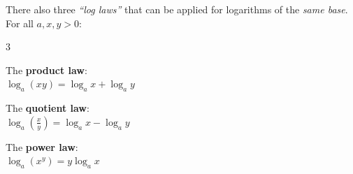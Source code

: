 \documentclass[
  11pt,
  openany]{book}
\begin{document}
\vspace{-0.9cm}

There also three \emph{``log laws''} that can be applied for logarithms of the \emph{same base}. For all \(a,x,y>0\):

\vspace{-0.5cm}

\begin{multicols}{3}

\begin{center}
\begin{tcolorbox}[colback=red!5,width=5.8cm,colframe=red!70!black,height=2cm]

The \textbf{product law}:\\[-0.2cm]

$\log_a{(xy)}=\log_a{x}+\log_a{y}$ 

\end{tcolorbox}
\end{center}

\begin{center}
\begin{tcolorbox}[colback=red!5,width=5.8cm,colframe=red!70!black,height=2cm]

The \textbf{quotient law}:\\[-0.2cm]

$\log_a{\left(\frac{x}{y}\right)}=\log_a{x}-\log_a{y}$ 

\end{tcolorbox}
\end{center}

\begin{center}
\begin{tcolorbox}[colback=red!5,width=5.8cm,colframe=red!70!black,height=2cm]

The \textbf{power law}:\\[-0.2cm]

$\log_a{\left(x^y\right)}=y\log_a{x}$ 

\end{tcolorbox}
\end{center}

\end{multicols}

\vspace{-0.3cm}
\end{document}
